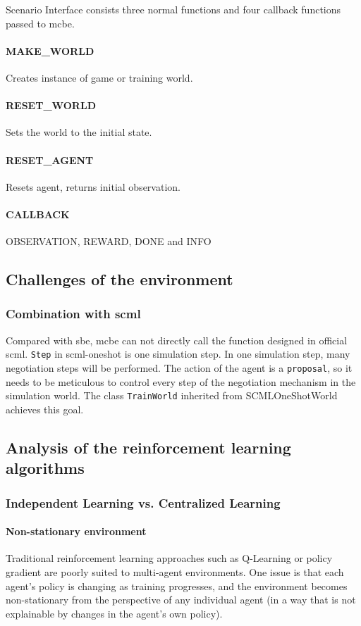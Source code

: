 Scenario Interface consists three normal functions and four callback functions passed to \gls{mcbe}.

\paragraph{MAKE\_WORLD} Creates instance of game or training world.
\paragraph{RESET\_WORLD} Sets the world to the initial state.
\paragraph{RESET\_AGENT} Resets agent, returns initial observation.
\paragraph{CALLBACK} OBSERVATION, REWARD, DONE and INFO

\subsection{Challenges of the environment}
\subsubsection{Combination with \gls{scml}}
Compared with \gls{sbe}, \gls{mcbe} can not directly call the function designed in official \gls{scml}. \texttt{Step} in \gls{scml-oneshot} is one simulation step. In one simulation step, many negotiation steps will be performed. The action of the agent is a \texttt{proposal}, so it needs to be meticulous to control every step of the negotiation mechanism in the simulation world. The class \texttt{TrainWorld} inherited from SCMLOneShotWorld achieves this goal.

\subsection{Analysis of the reinforcement learning algorithms}
\subsubsection{Independent Learning vs. Centralized Learning}
\paragraph{Non-stationary environment}
Traditional reinforcement learning approaches such as Q-Learning or policy gradient
are poorly suited to multi-agent environments. One issue is that each agent’s policy is changing as training progresses, and the environment becomes non-stationary from the perspective of any individual agent (in a way that is not explainable by changes in the agent’s own policy).


